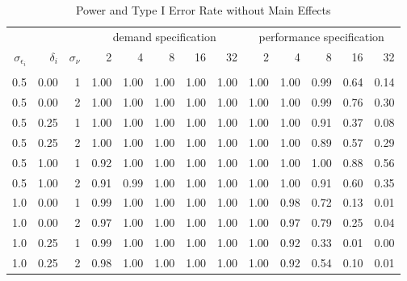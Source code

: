 \begin{table}

\caption{\label{tab:big-basis-table}Power and Type I Error Rate without Main Effects}
\centering
\fontsize{9}{11}\selectfont
\begin{threeparttable}
\begin{tabular}[t]{rrrrrrrrrrrrr}
\toprule
\multicolumn{3}{c}{ } & \multicolumn{5}{c}{demand specification} & \multicolumn{5}{c}{performance specification} \\
\cmidrule(l{3pt}r{3pt}){4-8} \cmidrule(l{3pt}r{3pt}){9-13}
$\sigma_{\epsilon_i}$ & $\delta_i$ & $\sigma_{\nu}$ & 2 & 4 & 8 & 16 & 32 & 2 & 4 & 8 & 16 & 32\\
\midrule
\addlinespace[0.3em]
\multicolumn{13}{c}{\textbf{Power}}\\
\hspace{1em}0.5 & 0.00 & 1 & 1.00 & 1.00 & 1.00 & 1.00 & 1.00 & 1.00 & 1.00 & 0.99 & 0.64 & 0.14\\
\hspace{1em}0.5 & 0.00 & 2 & 1.00 & 1.00 & 1.00 & 1.00 & 1.00 & 1.00 & 1.00 & 0.99 & 0.76 & 0.30\\
\hspace{1em}0.5 & 0.25 & 1 & 1.00 & 1.00 & 1.00 & 1.00 & 1.00 & 1.00 & 1.00 & 0.91 & 0.37 & 0.08\\
\hspace{1em}0.5 & 0.25 & 2 & 1.00 & 1.00 & 1.00 & 1.00 & 1.00 & 1.00 & 1.00 & 0.89 & 0.57 & 0.29\\
\hspace{1em}0.5 & 1.00 & 1 & 0.92 & 1.00 & 1.00 & 1.00 & 1.00 & 1.00 & 1.00 & 1.00 & 0.88 & 0.56\\
\hspace{1em}0.5 & 1.00 & 2 & 0.91 & 0.99 & 1.00 & 1.00 & 1.00 & 1.00 & 1.00 & 0.91 & 0.60 & 0.35\\
\hspace{1em}1.0 & 0.00 & 1 & 0.99 & 1.00 & 1.00 & 1.00 & 1.00 & 1.00 & 0.98 & 0.72 & 0.13 & 0.01\\
\hspace{1em}1.0 & 0.00 & 2 & 0.97 & 1.00 & 1.00 & 1.00 & 1.00 & 1.00 & 0.97 & 0.79 & 0.25 & 0.04\\
\hspace{1em}1.0 & 0.25 & 1 & 0.99 & 1.00 & 1.00 & 1.00 & 1.00 & 1.00 & 0.92 & 0.33 & 0.01 & 0.00\\
\hspace{1em}1.0 & 0.25 & 2 & 0.98 & 1.00 & 1.00 & 1.00 & 1.00 & 1.00 & 0.92 & 0.54 & 0.10 & 0.01\\

\end{tabular}
\end{threeparttable}
\end{table}
